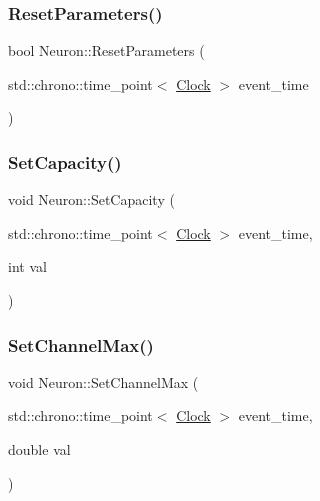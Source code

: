 \mbox{\label{classNeuron_a4c154fecb0b689d7da9d8d274f067ccf}} 
\subsubsection{\texorpdfstring{Reset\+Parameters()}{ResetParameters()}}
{\footnotesize\ttfamily bool Neuron\+::\+Reset\+Parameters (\begin{DoxyParamCaption}\item[{std\+::chrono\+::time\+\_\+point$<$ \mbox{\hyperlink{universe_8h_a0ef8d951d1ca5ab3cfaf7ab4c7a6fd80}{Clock}} $>$}]{event\+\_\+time }\end{DoxyParamCaption})}

\mbox{\label{classNeuron_a8f5766ea61dc46b7a25361df540755ec}} 
\subsubsection{\texorpdfstring{Set\+Capacity()}{SetCapacity()}}
{\footnotesize\ttfamily void Neuron\+::\+Set\+Capacity (\begin{DoxyParamCaption}\item[{std\+::chrono\+::time\+\_\+point$<$ \mbox{\hyperlink{universe_8h_a0ef8d951d1ca5ab3cfaf7ab4c7a6fd80}{Clock}} $>$}]{event\+\_\+time,  }\item[{int}]{val }\end{DoxyParamCaption})\hspace{0.3cm}{\ttfamily [inline]}}

\mbox{\label{classNeuron_aed1ba99e24b905cd91a519c33b5a62b0}} 
\subsubsection{\texorpdfstring{Set\+Channel\+Max()}{SetChannelMax()}}
{\footnotesize\ttfamily void Neuron\+::\+Set\+Channel\+Max (\begin{DoxyParamCaption}\item[{std\+::chrono\+::time\+\_\+point$<$ \mbox{\hyperlink{universe_8h_a0ef8d951d1ca5ab3cfaf7ab4c7a6fd80}{Clock}} $>$}]{event\+\_\+time,  }\item[{double}]{val }\end{DoxyParamCaption})\hspace{0.3cm}{\ttfamily [inline]}}

